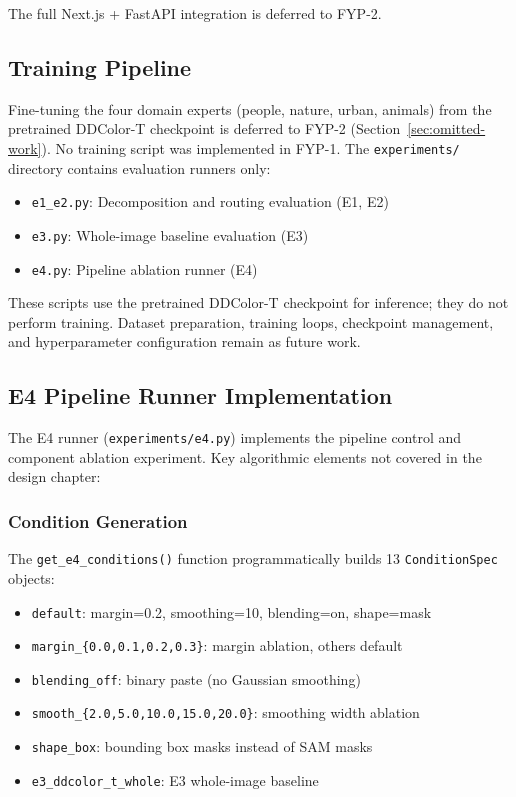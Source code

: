 \documentclass{FastFyp}
\begin{document}
The full Next.js + FastAPI integration is deferred to FYP-2.

\subsection{Training Pipeline}
\label{subsec:training-pipeline}

Fine-tuning the four domain experts (people, nature, urban, animals) from the pretrained DDColor-T checkpoint is deferred to FYP-2 (Section~\ref{sec:omitted-work}). No training script was implemented in FYP-1. The \texttt{experiments/} directory contains evaluation runners only:
\begin{itemize}
    \item \texttt{e1\_e2.py}: Decomposition and routing evaluation (E1, E2)
    \item \texttt{e3.py}: Whole-image baseline evaluation (E3)
    \item \texttt{e4.py}: Pipeline ablation runner (E4)
\end{itemize}
These scripts use the pretrained DDColor-T checkpoint for inference; they do not perform training. Dataset preparation, training loops, checkpoint management, and hyperparameter configuration remain as future work.

\subsection{E4 Pipeline Runner Implementation}
\label{subsec:e4-runner}

The E4 runner (\texttt{experiments/e4.py}) implements the pipeline control and component ablation experiment. Key algorithmic elements not covered in the design chapter:

\subsubsection{Condition Generation}
The \texttt{get\_e4\_conditions()} function programmatically builds 13 \texttt{ConditionSpec} objects:
\begin{itemize}
    \item \texttt{default}: margin=0.2, smoothing=10, blending=on, shape=mask
    \item \texttt{margin\_\{0.0,0.1,0.2,0.3\}}: margin ablation, others default
    \item \texttt{blending\_off}: binary paste (no Gaussian smoothing)
    \item \texttt{smooth\_\{2.0,5.0,10.0,15.0,20.0\}}: smoothing width ablation
    \item \texttt{shape\_box}: bounding box masks instead of SAM masks
    \item \texttt{e3\_ddcolor\_t\_whole}: E3 whole-image baseline
\end{itemize}
\end{document}
